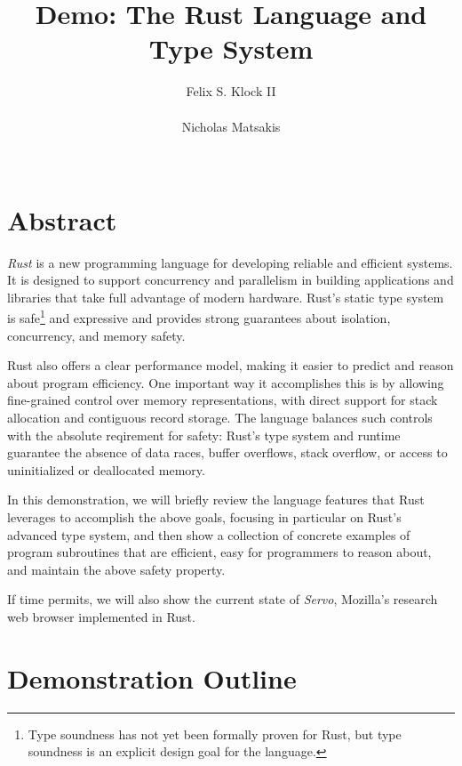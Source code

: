 \documentclass{acm_proc_article-sp}
\begin{document}
\title{Demo: The Rust Language and Type System}
\author{
\alignauthor
Felix S. Klock II\\
    \\
\alignauthor
Nicholas Matsakis\\
    \\
}
\maketitle

\section{Abstract}

\emph{Rust} is a new programming language for developing reliable and
efficient systems.  It is designed to support concurrency and
parallelism in building applications and libraries that take full
advantage of modern hardware.
 Rust's static type system is safe\footnote{Type soundness has not
  yet been formally proven for Rust, but type soundness is an
  explicit design goal for the language.} and expressive
and provides strong guarantees about isolation,
concurrency, and memory safety.

Rust also offers a clear performance model, making it easier to
predict and reason about program efficiency.  One important way it
accomplishes this is by allowing fine-grained control over memory
representations, with direct support for stack allocation and
contiguous record storage.  The language balances such controls with
the absolute reqirement for safety: Rust's type system and runtime
guarantee the absence of data races, buffer overflows, stack overflow,
or access to uninitialized or deallocated memory.

In this demonstration, we will briefly review the language features
that Rust leverages to accomplish the above goals, focusing in
particular on Rust's advanced type system, and then show a collection
of concrete examples of program subroutines that are efficient, easy
for programmers to reason about, and maintain the above safety
property.

If time permits, we will also show the current state of \emph{Servo},
Mozilla's research web browser implemented in Rust.

\section{Demonstration Outline}
\end{document}
